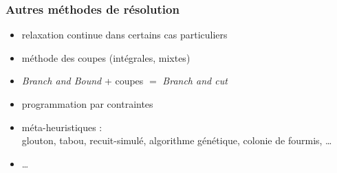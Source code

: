 \documentclass{beamer}
\begin{document}
\begin{frame}
  \frametitle{Autres méthodes de résolution}

  \begin{itemize}
  \item relaxation continue dans certains cas particuliers
  \item méthode des coupes (intégrales, mixtes)
  \item \emph{Branch and Bound} + coupes $=$ \emph{Branch and cut}
  \item programmation par contraintes
  \item méta-heuristiques : \\
    glouton, tabou, recuit-simulé, algorithme génétique, colonie de fourmis, \dots
  \item \dots
  \end{itemize}
  
\end{frame}
\end{document}
